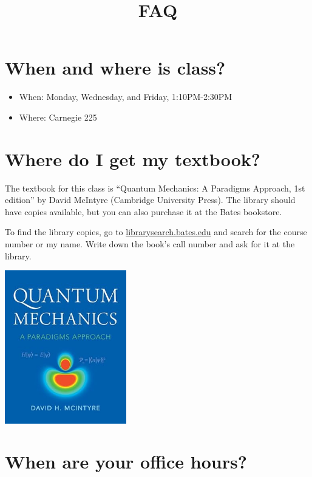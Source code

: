 \documentclass[
  letterpaper,
  DIV=11,
  numbers=noendperiod]{scrartcl}
\title{FAQ}
\author{}
\date{}
\providecommand{\tightlist}{%
  \setlength{\itemsep}{0pt}\setlength{\parskip}{0pt}}\usepackage{longtable,booktabs,array}
\renewcommand*\contentsname{Table of contents}
\newcommand\contentsname{Table of contents}
\begin{document}
\maketitle

\renewcommand*\contentsname{Table of contents}
{
\hypersetup{linkcolor=}
\setcounter{tocdepth}{3}
\tableofcontents
}
\section{When and where is class?}\label{when-and-where-is-class}

\begin{itemize}
\tightlist
\item
  When: Monday, Wednesday, and Friday, 1:10PM-2:30PM
\item
  Where: Carnegie 225
\end{itemize}

\section{Where do I get my textbook?}\label{where-do-i-get-my-textbook}

The textbook for this class is ``Quantum Mechanics: A Paradigms
Approach, 1st edition'' by David McIntyre (Cambridge University Press).
The library should have copies available, but you can also purchase it
at the Bates bookstore.

To find the library copies, go to \url{librarysearch.bates.edu} and
search for the course number or my name. Write down the book's call
number and ask for it at the library.

\includegraphics[width=2.08333in,height=\textheight]{images/QMMcIntyre.jpg}

\section{When are your office hours?}\label{officehours}
\end{document}
